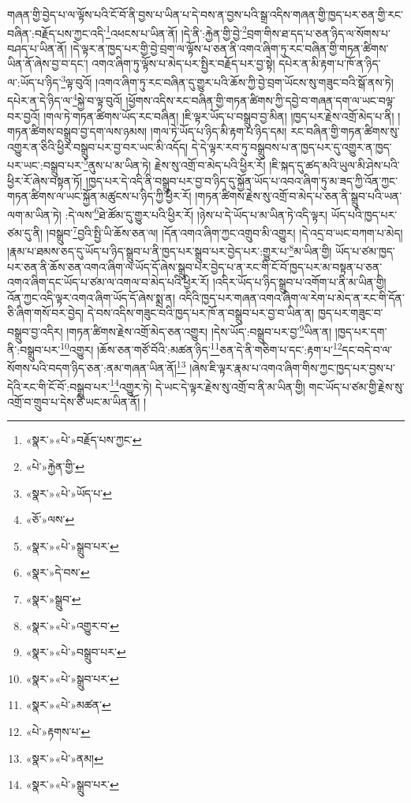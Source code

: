 གཞན་གྱི་བྱེད་པ་ལ་ལྟོས་པའི་ངོ་བོ་ནི་བྱས་པ་ཡིན་པ་དེ་བས་ན་བྱས་པའི་སྒྲ་འདིས་གཞན་གྱི་ཁྱད་པར་ཅན་གྱི་རང་བཞིན་:བརྗོད་པས་ཀྱང་འདི་\footnote{«སྣར་»«པེ་»བརྗོད་པས་ཀྱང་}འཕངས་པ་ཡིན་ནོ། །དེ་ནི་:རྐྱེན་གྱི་བྱེ་\footnote{«པེ་»རྐྱེན་གྱི་}བྲག་གིས་ཐ་དད་པ་ཅན་ཉིད་ལ་སོགས་པ་བཤད་པ་ཡིན་ནོ། །དེ་ལྟར་ན་ཁྱད་པར་གྱི་བྱེ་བྲག་ལ་ལྟོས་པ་ཅན་ནི་འགའ་ཞིག་ཏུ་རང་བཞིན་གྱི་གཏན་ཚིགས་ཡིན་ནོ་ཞེས་བྱ་བ་དང་། འགའ་ཞིག་ཏུ་ལྟོས་པ་མེད་པར་སྤྱིར་བརྗོད་པར་བྱ་སྟེ། དཔེར་ན་མི་རྟག་པ་ཁོ་ན་ཉིད་ལ་:ཡོད་པ་ཉིད་\footnote{«སྣར་»«པེ་»ཡོད་པ་}ལྟ་བུའོ། །འགའ་ཞིག་ཏུ་རང་བཞིན་དུ་གྱུར་པའི་ཆོས་ཀྱི་བྱེ་བྲག་ཡོངས་སུ་གཟུང་བའི་སྒོ་ནས་ཏེ། དཔེར་ན་དེ་ཉིད་ལ་\footnote{«ཅོ་»ལས་}སྐྱེ་བ་ལྟ་བུའོ། །ཕྱོགས་འདིས་རང་བཞིན་གྱི་གཏན་ཚིགས་ཀྱི་དབྱེ་བ་གཞན་དག་ལ་ཡང་བལྟ་བར་བྱའོ། །གལ་ཏེ་གཏན་ཚིགས་ཡོད་རང་བཞིན། །ཇི་ལྟར་ཡོད་པ་བསྒྲུབ་བྱ་མིན། །ཁྱད་པར་རྗེས་འགྲོ་མེད་པ་ནི། །གཏན་ཚིགས་བསྒྲུབ་བྱ་དག་ལས་ཉམས། །གལ་ཏེ་ཡོད་པ་ཉིད་མི་རྟག་པ་ཉིད་དམ། རང་བཞིན་གྱི་གཏན་ཚིགས་སུ་འགྱུར་ན་ཅིའི་ཕྱིར་བསྒྲུབ་པར་བྱ་བར་ཡང་མི་འདོད། དེ་དེ་ལྟར་རབ་ཏུ་བསྒྲུབས་པ་ན་ཁྱད་པར་དུ་འགྱུར་ན་ཁྱད་པར་ཡང་:བསྒྲུབ་པར་\footnote{«སྣར་»«པེ་»སྒྲུབ་པར་}ནུས་པ་མ་ཡིན་ཏེ། རྗེས་སུ་འགྲོ་བ་མེད་པའི་ཕྱིར་རོ། །ཇི་སྐད་དུ་ཚད་མའི་ཡུལ་མི་ཤེས་པའི་ཕྱིར་རོ་ཞེས་བསྟན་ཏོ། །ཁྱད་པར་དེ་འདི་ནི་བསྒྲུབ་པར་བྱ་བ་ཉིད་དུ་སྐྱོན་ཡོད་པ་འབའ་ཞིག་ཏུ་མ་ཟད་ཀྱི་འོན་ཀྱང་གཏན་ཚིགས་ལ་ཡང་སྐྱོན་མཚུངས་པ་ཉིད་ཀྱི་ཕྱིར་རོ། །གཏན་ཚིགས་རྗེས་སུ་འགྲོ་བ་མེད་པ་ཅན་ནི་སྒྲུབ་པའི་ཡན་ལག་མ་ཡིན་ཏེ། :དེ་ལས་\footnote{«སྣར་»དེ་བས་}ཐེ་ཚོམ་དུ་གྱུར་པའི་ཕྱིར་རོ། །ཉེས་པ་དེ་ཡོད་པ་མ་ཡིན་ཏེ་འདི་ལྟར། ཡོད་པའི་ཁྱད་པར་ཙམ་དུ་ནི། །བསྒྲུབ་\footnote{«སྣར་»སྒྲུབ་}བྱའི་སྤྱི་ཡི་ཆོས་ཅན་ལ། །དོན་འགའ་ཞིག་ཀྱང་འགྲུབ་མི་འགྱུར། །དེ་འདྲ་བ་ཡང་བཀག་པ་མེད། །རྣམ་པ་ཐམས་ཅད་དུ་ཡོད་པ་ཉིད་སྒྲུབ་པ་ནི་ཁྱད་པར་སྒྲུབ་པར་བྱེད་པར་:གྱུར་པ་\footnote{«སྣར་»«པེ་»འགྱུར་བ་}མ་ཡིན་གྱི། ཡོད་པ་ཙམ་ཁྱད་པར་ཅན་ནི་ཆོས་ཅན་འགའ་ཞིག་ལ་ཡོད་དོ་ཞེས་སྒྲུབ་པར་བྱེད་པ་ན་རང་གི་ངོ་བོ་ཁྱད་པར་མ་བསྟན་པ་ཅན་འགའ་ཞིག་དང་ཡོད་པ་ཙམ་ལ་འགལ་བ་མེད་པའི་ཕྱིར་རོ། །འདིར་ཡོད་པ་ཉིད་སྒྲུབ་པ་འགོག་པ་ནི་མ་ཡིན་གྱི། འོན་ཀྱང་འདི་ལྟར་འགའ་ཞིག་ཡོད་དོ་ཞེས་སྨྲ་ན། འདིའི་ཁྱད་པར་གཞན་འགའ་ཞིག་ལ་རེག་པ་མེད་ན་རང་གི་དོན་ཅི་ཞིག་གསོ་བར་བྱེད། དེ་བས་འདིས་གཟུང་བའི་ཁྱད་པར་ཁོ་ན་བསྒྲུབ་པར་བྱ་བ་ཡིན་ན། ཁྱད་པར་གཟུང་བ་བསྒྲུབ་བྱ་འདིར། །གཏན་ཚིགས་རྗེས་འགྲོ་མེད་ཅན་འགྱུར། །དེས་ཡོད་:བསྒྲུབ་པར་བྱ་\footnote{«སྣར་»«པེ་»བསྒྲུབ་པར་}ཡིན་ན། །ཁྱད་པར་དག་ནི་:བསྒྲུབ་པར་\footnote{«སྣར་»«པེ་»སྒྲུབ་པར་}འགྱུར། །ཆོས་ཅན་གཙོ་བོའི་:མཚན་ཉིད་\footnote{«སྣར་»«པེ་»མཚན་}ཅན་དེ་ནི་གཅིག་པ་དང་:རྟག་པ་\footnote{«པེ་»རྟགས་པ་}དང་བདེ་བ་ལ་སོགས་པའི་བདག་ཉིད་ཅན་:ནམ་གཞན་ཡིན་ནོ།\footnote{«སྣར་»«པེ་»ནམ།} །ཞེས་ཇི་ལྟར་རྣམ་པ་འགའ་ཞིག་གིས་ཀྱང་ཁྱད་པར་བྱས་པ་དེའི་རང་གི་ངོ་བོ་:བསྒྲུབ་པར་\footnote{«སྣར་»«པེ་»སྒྲུབ་པར་}འགྱུར་ཏེ། དེ་ཡང་དེ་ལྟར་རྗེས་སུ་འགྲོ་བ་ནི་མ་ཡིན་གྱི། གང་ཡོད་པ་ཙམ་གྱི་རྗེས་སུ་འགྲོ་བ་གྲུབ་པ་དེས་ཅི་ཡང་མ་ཡིན་ནོ། །

